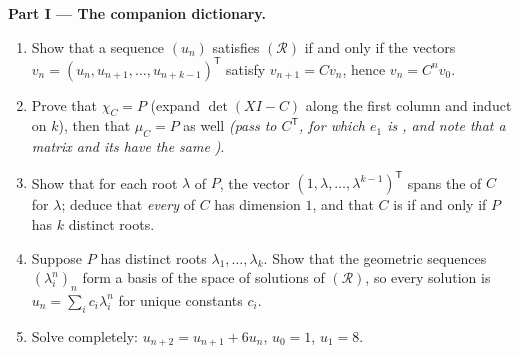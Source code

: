 \begin{problem}
\medskip
\noindent\textbf{Part I --- The companion dictionary.}
\begin{enumerate}
  \item Show that a sequence $(u_n)$ satisfies $(\mathcal R)$ if
        and only if the vectors $v_n = (u_n, u_{n+1}, \dots,
        u_{n+k-1})^{\mathsf T}$ satisfy $v_{n+1} = Cv_n$, hence
        $v_n = C^n v_0$.
  \item Prove that $\chi_C = P$ (expand $\det(XI - C)$ along the
        first column and induct on $k$), then that $\mu_C = P$
        as well \emph{(pass to $C^{\mathsf T}$, for which $e_1$
        is , and note that a matrix and its  have
        the same )}.
  \item Show that for each root $\lambda$ of $P$, the vector
        $(1, \lambda, \dots, \lambda^{k-1})^{\mathsf T}$ spans
        the  of $C$ for $\lambda$; deduce that
        \emph{every}  of $C$ has dimension $1$, and
        that $C$ is  if and only if $P$ has $k$
        distinct roots.
  \item Suppose $P$ has distinct roots $\lambda_1, \dots,
        \lambda_k$. Show that the geometric sequences
        $(\lambda_i^n)_n$ form a basis of the space of solutions
        of $(\mathcal R)$, so every solution is $u_n = \sum_i
        c_i\lambda_i^n$ for unique constants $c_i$.
  \item Solve completely: $u_{n+2} = u_{n+1} + 6u_n$, $u_0 = 1$,
        $u_1 = 8$.
\end{enumerate}


\end{problem}
